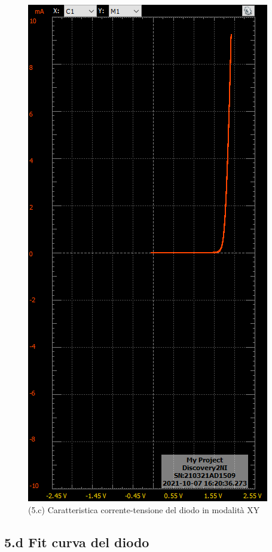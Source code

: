 \documentclass[10pt,a4paper]{article}
\begin{document}
\begin{figure}[h]
\centering
\includegraphics[scale=0.4]{shockley_new}
\caption{(5.c) Caratteristica corrente-tensione del diodo in modalit\`a XY}
\end{figure}

\subsection*{5.d Fit curva del diodo}
\par
\end{document}

